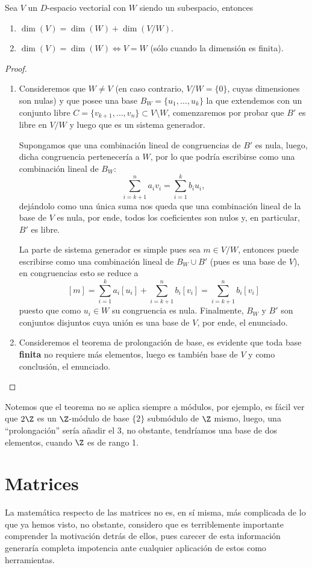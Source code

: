 \documentclass[11pt,oneside]{book}
\begin{document}
\begin{thm}
Sea $V$ un $D$-espacio vectorial con $W$ siendo un subespacio, entonces
\begin{enumerate}
	\item $\dim(V)=\dim(W)+\dim(V/W)$.
	\item $\dim(V)=\dim(W)\iff V=W$ (sólo cuando la dimensión es finita).
\end{enumerate}
\end{thm}
\begin{proof}
\begin{enumerate}
	\item Consideremos que $W\neq V$ (en caso contrario, $V/W=\{0\}$, cuyas dimensiones son nulas) y que posee una base $B_W=\{u_1,\dots,u_k\}$ la que extendemos con un conjunto libre $C=\{v_{k+1},\dots,v_n\}\subset V\setminus W$, comenzaremos por probar que $B'$ es libre en $V/W$ y luego que es un sistema generador.
	
	Supongamos que una combinación lineal de congruencias de $B'$ es nula, luego, dicha congruencia pertenecería a $W$, por lo que podría escribirse como una combinación lineal de $B_W$:
	$$\sum_{i=k+1}^n a_iv_i=\sum_{i=1}^k b_iu_i,$$
	dejándolo como una única suma nos queda que una combinación lineal de la base de $V$ es nula, por ende, todos los coeficientes son nulos y, en particular, $B'$ es libre.
	
	La parte de sistema generador es simple pues sea $m\in V/W$, entonces puede escribirse como una combinación lineal de $B_W\cup B'$ (pues es una base de $V$), en congruencias esto se reduce a 
	$$[m]=\sum_{i=1}^k a_i[u_i]+\sum_{i=k+1}^n b_i[v_i]=\sum_{i=k+1}^n b_i[v_i]$$
	puesto que como $u_i\in W$ su congruencia es nula. Finalmente, $B_W$ y $B'$ son conjuntos disjuntos cuya unión es una base de $V$, por ende, el enunciado.
	\item Consideremos el teorema de prolongación de base, es evidente que toda base \textbf{finita} no requiere más elementos, luego es también base de $V$ y como conclusión, el enunciado.
\end{enumerate}
\end{proof}
Notemos que el teorema no se aplica siempre a módulos, por ejemplo, es fácil ver que $2\Z$ es un $\Z$-módulo de base $\{2\}$ submódulo de $\Z$ mismo, luego, una ``prolongación'' sería añadir el 3, no obstante, tendríamos una base de dos elementos, cuando $\Z$ es de rango 1.

\section{Matrices}
La matemática respecto de las matrices no es, en sí misma, más complicada de lo que ya hemos visto, no obstante, considero que es terriblemente importante comprender la motivación detrás de ellos, pues carecer de esta información generaría completa impotencia ante cualquier aplicación de estos como herramientas.
\end{document}
